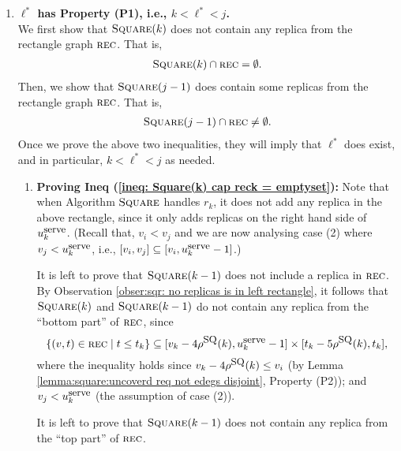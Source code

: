 \documentclass[11pt]{article}
\newcommand{\Square}[0]{\mbox{\sc Square}}
\newcommand{\uSQ}{u^{\mbox{\small\upshape serve}}}
\newcommand{\rhoSQ}[0]{\rho^{\mbox{\small\upshape SQ}}}
\newcommand{\reck}[0]{\mbox{\sc rec}}
\begin{document}
\begin{enumerate}





\item {\bf $\ell^*$ has Property (P1), i.e., $k<\ell^*<j$.}\\
We first show that $\Square(k)$ does not contain  any replica from the rectangle graph $\reck$.
That is,
\begin{eqnarray}
\label{ineq: Square(k) cap reck = emptyset}
\Square(k)\cap\reck=\emptyset.
\end{eqnarray}
Then, we show that $\Square(j-1)$ does contain some replicas from the rectangle graph $\reck$.
That is,
\begin{eqnarray}
\label{ineq: Square(j-1) cap reck not= emptyset}
\Square(j-1)\cap\reck\not=\emptyset.
\end{eqnarray}
Once we prove the above two inequalities, they will imply that $\ell^*$ does exist, and in particular, $k<\ell^*<j$ as needed.



\begin{enumerate}
\item[] {\bf Proving Ineq (\ref{ineq: Square(k) cap reck = emptyset}):}
Note that when Algorithm $\Square$ handles $r_k$, it does not add any replica in the above rectangle,
since it only adds replicas on the right hand side of $\uSQ_k$.
(Recall that, $v_i<v_j$ and we are now analysing case (2) where $v_j<\uSQ_k$, i.e., $[v_i,v_j]\subseteq[v_i,\uSQ_k-1]$.)

\vspace{1cm}
It is left to prove that $\Square(k-1)$ does not include a replica in $\reck$.
By Observation \ref{obser:sqr: no replicas is in left rectangle},
it follows that $\Square(k)$ and $\Square(k-1)$ do not contain  any replica from the ``bottom part'' of $\reck$,
since
$$
\{(v,t)\in\reck \mid t\leq t_k\}
\subseteq
[v_k-4\rhoSQ(k),\uSQ_k-1]\times[t_k-5\rhoSQ(k),t_k]
,$$
where the inequality holds since
$v_k-4\rhoSQ(k) \leq v_i$ (by Lemma \ref{lemma:square:uncoverd req not edegs disjoint}, Property (P2)); and
$v_j < \uSQ_k$ (the assumption of case (2)).





It is left to prove that $\Square(k-1)$ does not contain any replica from the ``top part'' of $\reck$.

\vspace{0.2cm}


\end{enumerate}
\end{enumerate}
\end{document}

